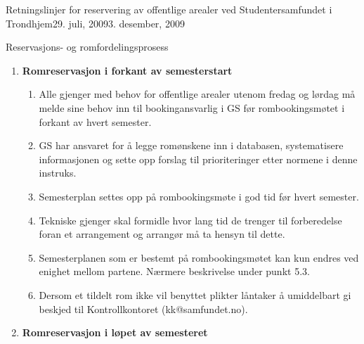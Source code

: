 \begin{instruks}{Retningslinjer for reservering av offentlige arealer
    ved Studentersamfundet i Trondhjem}{29. juli, 2009}{3. desember, 2009}
\begin{instruksledd}{Reservasjons- og romfordelingsprosess}
        \begin{enumerate}
            \item \textbf{Romreservasjon i forkant av semesterstart}
                \begin{enumerate}
                    \item Alle gjenger med behov for offentlige arealer utenom fredag
                        og lørdag må melde sine behov inn til
                        bookingansvarlig i GS før rombookingsmøtet i forkant av hvert
                        semester.
                    \item GS har ansvaret for å legge romønskene inn i databasen,
                        systematisere informasjonen og sette opp forslag til
                        prioriteringer etter normene i denne instruks.
                    \item Semesterplan settes opp på rombookingsmøte i god tid før
                        hvert semester.
                    \item Tekniske gjenger skal formidle hvor lang tid de trenger til
                        forberedelse foran et arrangement og arrangør må
                        ta hensyn til dette.
                    \item Semesterplanen som er bestemt på rombookingsmøtet kan kun
                        endres ved enighet mellom partene. Nærmere
                        beskrivelse under punkt 5.3.
                    \item Dersom et tildelt rom ikke vil benyttet plikter låntaker å
                        umiddelbart gi beskjed til Kontrollkontoret
                        (kk@samfundet.no).
                \end{enumerate}

            \item \textbf{Romreservasjon i løpet av semesteret}


\end{enumerate}
\end{instruksledd}
\end{instruks}
